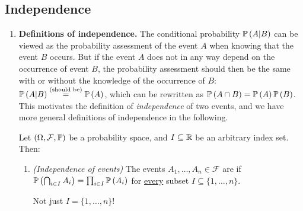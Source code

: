 \subsection{Independence}
\label{subsect:independence}
\begin{enumerate}
\item \textbf{Definitions of independence.} The conditional probability
\(\mathbb{P}\left(A|B\right)\) can be viewed as the probability assessment of the event \(A\)
when knowing that the event \(B\) occurs.  But if the event \(A\) does not in
any way depend on the occurrence of event \(B\), the probability assessment
should then be the same with or without the knowledge of the occurrence of
\(B\): \(\mathbb{P}\left(A|B\right)\overset{\text{(should be)}}{=}\mathbb{P}\left(A\right)\), which can be
rewritten as \(\mathbb{P}\left(A\cap B\right)=\mathbb{P}\left(A\right)\mathbb{P}\left(B\right)\). This motivates the definition
of \emph{independence} of two events, and we have more general definitions of
independence in the following.

Let \((\Omega,\mathcal{F},\mathbb{P})\) be a probability space, and \(I\subseteq \mathbb{R}\)
be an arbitrary index set. Then:
\begin{enumerate}
\item \emph{(Independence of events)} The events \(A_1,\dotsc,A_n\in\mathcal{F}\) are  if
\(\mathbb{P}\left(\bigcap_{i\in I}^{}A_i\right)=\prod_{i\in I}^{}\mathbb{P}\left(A_i\right)\) for
\underline{every} subset \(I\subseteq \{1,\dotsc,n\}\). \begin{warning} Not
just \(I=\{1,\dotsc,n\}\)!  \end{warning}


\end{enumerate}
\end{enumerate}
